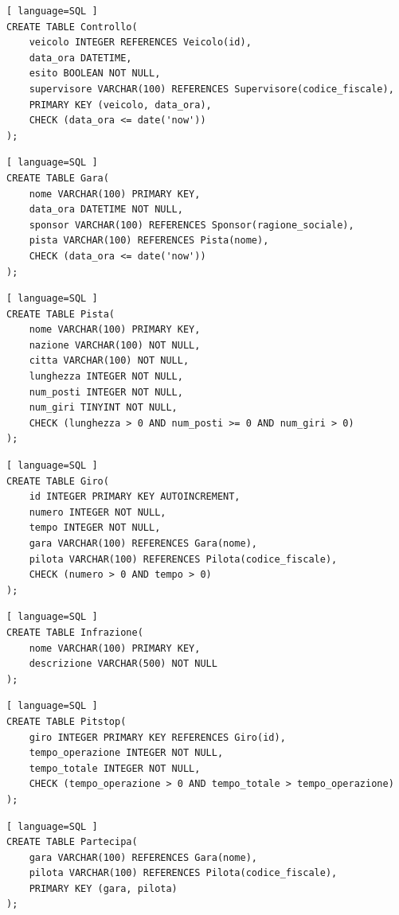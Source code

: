 \documentclass[11pt]{article}
\begin{document}
\begin{lstlisting}[ language=SQL ]
CREATE TABLE Controllo(
    veicolo INTEGER REFERENCES Veicolo(id),
    data_ora DATETIME,
    esito BOOLEAN NOT NULL,
    supervisore VARCHAR(100) REFERENCES Supervisore(codice_fiscale),
    PRIMARY KEY (veicolo, data_ora),
    CHECK (data_ora <= date('now'))
);
\end{lstlisting}

\begin{lstlisting}[ language=SQL ]
CREATE TABLE Gara(
    nome VARCHAR(100) PRIMARY KEY,
    data_ora DATETIME NOT NULL,
    sponsor VARCHAR(100) REFERENCES Sponsor(ragione_sociale),
    pista VARCHAR(100) REFERENCES Pista(nome),
    CHECK (data_ora <= date('now'))
);
\end{lstlisting}

\begin{lstlisting}[ language=SQL ]
CREATE TABLE Pista(
    nome VARCHAR(100) PRIMARY KEY,
    nazione VARCHAR(100) NOT NULL,
    citta VARCHAR(100) NOT NULL,
    lunghezza INTEGER NOT NULL,
    num_posti INTEGER NOT NULL,
    num_giri TINYINT NOT NULL,
    CHECK (lunghezza > 0 AND num_posti >= 0 AND num_giri > 0)
);
\end{lstlisting}

\begin{lstlisting}[ language=SQL ]
CREATE TABLE Giro(
    id INTEGER PRIMARY KEY AUTOINCREMENT,
    numero INTEGER NOT NULL,
    tempo INTEGER NOT NULL,
    gara VARCHAR(100) REFERENCES Gara(nome),
    pilota VARCHAR(100) REFERENCES Pilota(codice_fiscale),
    CHECK (numero > 0 AND tempo > 0)
);
\end{lstlisting}

\begin{lstlisting}[ language=SQL ]
CREATE TABLE Infrazione(
    nome VARCHAR(100) PRIMARY KEY,
    descrizione VARCHAR(500) NOT NULL
);
\end{lstlisting}

\begin{lstlisting}[ language=SQL ]
CREATE TABLE Pitstop(
    giro INTEGER PRIMARY KEY REFERENCES Giro(id),
    tempo_operazione INTEGER NOT NULL,
    tempo_totale INTEGER NOT NULL,
    CHECK (tempo_operazione > 0 AND tempo_totale > tempo_operazione)
);
\end{lstlisting}

\begin{lstlisting}[ language=SQL ]
CREATE TABLE Partecipa(
    gara VARCHAR(100) REFERENCES Gara(nome),
    pilota VARCHAR(100) REFERENCES Pilota(codice_fiscale),
    PRIMARY KEY (gara, pilota)
);
\end{lstlisting}
\end{document}
